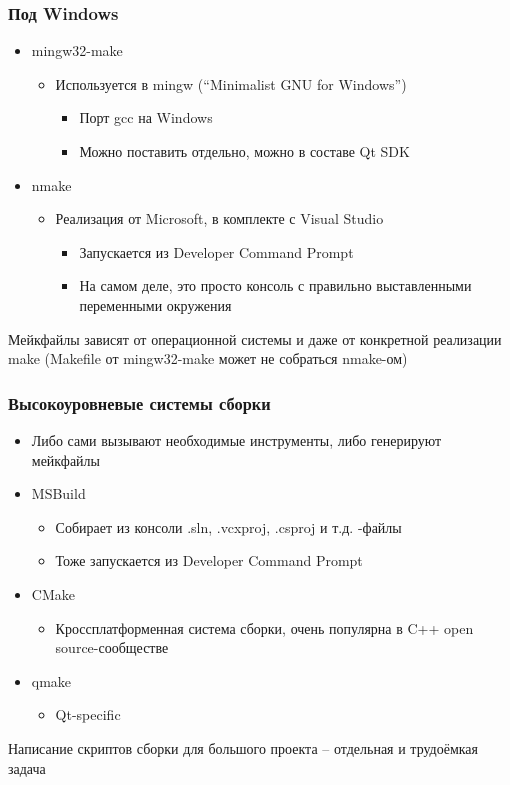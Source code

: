 \documentclass[xetex,mathserif,serif]{beamer}
\begin{document}
	\begin{frame}
		\frametitle{Под Windows}
		\begin{itemize}
			\item mingw32-make
			\begin{itemize}
				\item Используется в mingw (``Minimalist GNU for Windows'')
				\begin{itemize}
					\item Порт gcc на Windows
					\item Можно поставить отдельно, можно в составе Qt SDK
				\end{itemize}
			\end{itemize}
			\item nmake
			\begin{itemize}
				\item Реализация от Microsoft, в комплекте с Visual Studio
				\begin{itemize}
					\item Запускается из Developer Command Prompt
					\item На самом деле, это просто консоль с правильно выставленными переменными окружения
				\end{itemize}
			\end{itemize}
		\end{itemize}
		Мейкфайлы зависят от операционной системы и даже от конкретной реализации make (Makefile от mingw32-make может не собраться nmake-ом)
	\end{frame}

	\begin{frame}
		\frametitle{Высокоуровневые системы сборки}
		\begin{itemize}
			\item Либо сами вызывают необходимые инструменты, либо генерируют мейкфайлы
			\item MSBuild
			\begin{itemize}
				\item Собирает из консоли .sln, .vcxproj, .csproj и т.д. -файлы
				\item Тоже запускается из Developer Command Prompt
			\end{itemize}
			\item CMake
			\begin{itemize}
				\item Кроссплатформенная система сборки, очень популярна в C++ open source-сообществе
			\end{itemize}
			\item qmake
			\begin{itemize}
				\item Qt-specific
			\end{itemize}
		\end{itemize}
		Написание скриптов сборки для большого проекта – отдельная и трудоёмкая задача
	\end{frame}
\end{document}
